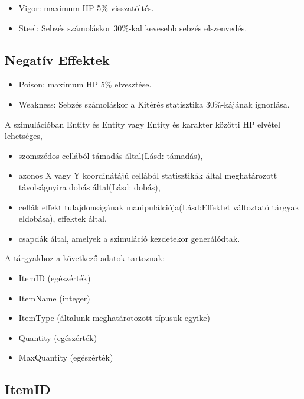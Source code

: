 \begin{itemize}
    \item Vigor: maximum HP 5\% visszatöltés.
    \item Steel: Sebzés számoláskor 30\%-kal kevesebb sebzés elszenvedés.
\end{itemize}

\subsection{Negatív Effektek}

\begin{itemize}
    \item Poison: maximum HP 5\% elvesztése.
    \item Weakness: Sebzés számoláskor a Kitérés statisztika 30\%-kájának ignorlása.
\end{itemize}


A szimulációban Entity és Entity vagy Entity és karakter közötti HP elvétel lehetséges,
\begin{itemize}
    \item szomszédos cellából támadás által(Lásd: támadás),
    \item azonos X vagy Y koordinátájú cellából statisztikák által meghatározott távolságnyira dobás által(Lásd: dobás),
    \item cellák effekt tulajdonságának manipulálciója(Lásd:Effektet változtató tárgyak eldobása), effektek által,
    \item csapdák által, amelyek a szimuláció kezdetekor generálódtak.
\end{itemize}


A tárgyakhoz a következő adatok tartoznak:
\begin{itemize}
    \item ItemID (egészérték)
    \item ItemName (integer)
    \item ItemType (általunk meghatárotozott típusuk egyike)
    \item Quantity (egészérték)
    \item MaxQuantity (egészérték)
\end{itemize}

\subsection{ItemID}

